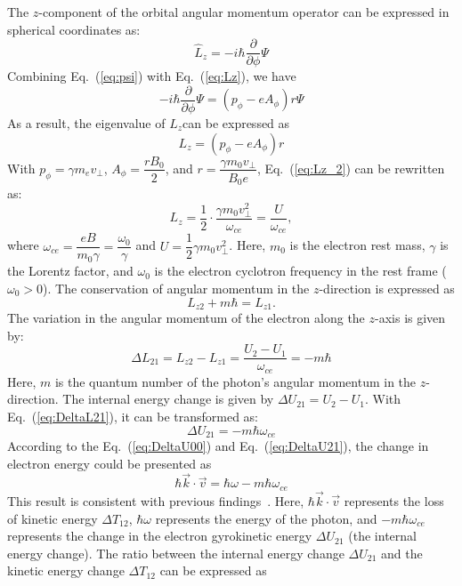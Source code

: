 \documentclass{cpbtex3}
\begin{document}
The $z$-component of the orbital angular momentum operator can be expressed in spherical coordinates as:
\begin{equation}
\hat{L}_z = -i\hbar\frac{\partial}{\partial\phi} \Psi \label{eq:Lz}
\end{equation}
Combining Eq.~(\ref{eq:psi}) with Eq.~(\ref{eq:Lz}), we have 
\begin{equation}
-i\hbar \frac{\partial}{\partial \phi} \Psi = (p_\phi - eA_\phi) r \Psi
\end{equation}
As a result, the eigenvalue of  $L_z $can be expressed as
\begin{equation}
L_z = (p_\phi - e A_\phi) r  \label{eq:Lz_2}
\end{equation}
With \( p_\phi = \gamma m_e v_\perp \), \( A_\phi = \dfrac{r B_0}{2} \), and \( r = \dfrac{\gamma m_0 v_\perp}{B_0 e} \), Eq.~(\ref{eq:Lz_2}) can be rewritten as:
\begin{equation}
L_z = \frac{1}{2} \cdot \frac{\gamma m_0 v_\perp^2}{\omega_{ce}} = \frac{U}{\omega_{ce}},
\end{equation}
where \(\omega_{ce} = \dfrac{eB}{m_0 \gamma} = \dfrac{\omega_0}{\gamma}\) and \(U = \dfrac{1}{2} \gamma m_0 v_\perp^2\).
Here, \( m_0 \) is the electron rest mass, \( \gamma \) is the Lorentz factor, and \( \omega_0 \) is the electron cyclotron frequency in the rest frame (\( \omega_0 > 0 \)). The conservation of angular momentum in the \( z \)-direction is expressed as
\[
L_{z2} + m\hbar = L_{z1}.
\]
The variation in the angular momentum of the electron along the \( z \)-axis is given by:
\begin{equation}
\Delta L_{21} = L_{z2} - L_{z1} = \frac{U_2 - U_1}{\omega_{ce}} = -m\hbar \label{eq:DeltaL21}
\end{equation}
Here, \( m \) is the quantum number of the photon's angular momentum in the \( z \)-direction. The internal energy change is given by \( \Delta U_{21} = U_2 - U_1 \). With Eq.~(\ref{eq:DeltaL21}), it can be transformed as:
\begin{equation}
\Delta U_{21}=-m \hbar \omega_{ce}  \label{eq:DeltaU21}
\end{equation}
According to the Eq.~(\ref{eq:DeltaU00})  and Eq.~(\ref{eq:DeltaU21}), the change in electron energy  could be presented as 
\begin{equation}
\hbar \vec{k} \cdot \vec{v} = \hbar \omega - m \hbar \omega_{ce}
\end{equation}
This result is consistent with previous findings~\cite{tamm1959general, frank1960optics, nezlin1976negative, coppi1976slide, frolov1986excitation, ginzburg1996radiation}. Here, \( \hbar \vec{k} \cdot \vec{v} \) represents the loss of kinetic energy \( \Delta T_{12} \), \( \hbar \omega \) represents the energy of the photon, and \( -m \hbar \omega_{ce} \) represents the change in the electron gyrokinetic energy \( \Delta U_{21} \) (the internal energy change). The ratio between the internal energy change \( \Delta U_{21} \) and the kinetic energy change \( \Delta T_{12} \) can be expressed as
\end{document}
